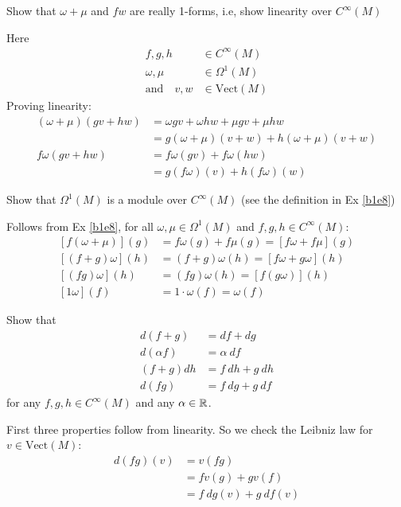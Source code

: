 \documentclass[10pt]{article}
\begin{document}
\begin{example}
	Show that $\omega + \mu$ and $fw$ are really 1-forms, i.e, show linearity over $C^\infty(M)$
\end{example}
\sol Here
$$
\begin{aligned}
	f,g,h &\in C^\infty(M)\\
	\omega, \mu &\in \Omega^1(M)\\
	\text{and} \quad v, w &\in \text{Vect}(M)
\end{aligned}
$$
Proving linearity:
$$
\begin{aligned}
	(\omega + \mu)(gv+hw) &= \omega gv + \omega hw + \mu gv + \mu hw\\
	&= g(\omega + \mu)(v+w) + h(\omega + \mu)(v+w)\\
	f\omega(gv+hw) &= f\omega(gv) + f\omega(hw)\\
	&= g(f\omega)(v) + h(f\omega)(w)
\end{aligned}
$$


\begin{example}
	Show that $\Omega^1(M)$ is a module over $C^\infty(M)$ (see the definition in Ex \ref{b1e8})
\end{example}
\sol Follows from Ex \ref{b1e8}, for all $\omega, \mu \in \Omega^1(M)$ and $f,g,h \in C^\infty(M)$:
$$
\begin{aligned}
	[f(\omega+\mu)](g) &= f\omega(g) + f\mu(g) = [f\omega + f\mu](g)\\
	[(f+g)\omega](h) &= (f+g)\omega(h)=[f\omega+g\omega](h)\\
	[(fg)\omega](h) &= (fg)\omega(h)=[f(g\omega)](h)\\
	[1\omega](f) &= 1\cdot \omega(f)=\omega(f)
\end{aligned}
$$


\begin{example}
	Show that
	$$
	\begin{aligned}
		d(f+g) &= df+dg\\
		d(\alpha f) &= \alpha\: df\\
		(f+g)dh &= f\:dh+g\:dh\\
		d(fg) &= f\:dg+g\:df
	\end{aligned}
	$$
	for any $f,g,h \in C^\infty(M)$ and any $\alpha \in \mathbb{R}$.
\end{example}
\sol First three properties follow from linearity. So we check the Leibniz law for $v \in \text{Vect}(M)$:
$$
	\begin{aligned}
		d(fg)(v) &= v(fg)\\
		&= fv(g) + gv(f)\\
		&= f\:dg(v) + g\:df(v)\\
	\end{aligned}
$$
\end{document}
